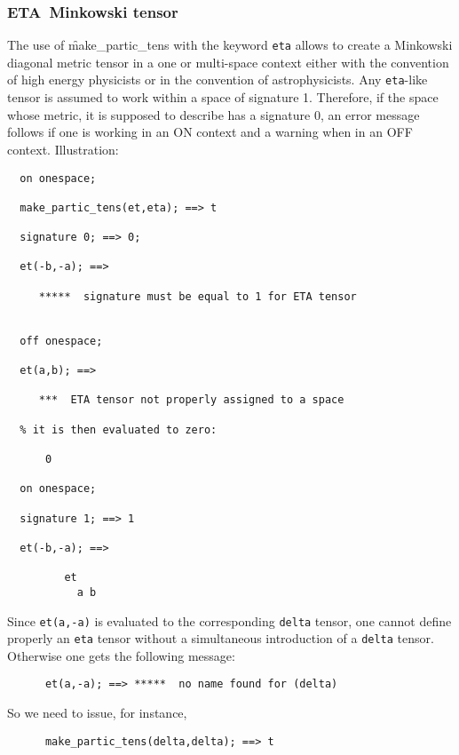 \subsubsection{ETA\ Minkowski tensor}
The use of \f{make\_partic\_tens} with the
keyword \texttt{eta} allows to create a Minkowski diagonal metric tensor in a
one or multi-space context either with the convention of
 high energy physicists or in the convention of astrophysicists.
Any \texttt{eta}-like tensor is assumed to work within a space
of signature 1. Therefore, if the space whose metric, it is supposed
to describe has a signature 0, an error message follows if one is
working in an ON 
context and a warning when in an OFF  context.
Illustration:
\begin{verbatim}
  on onespace;

  make_partic_tens(et,eta); ==> t

  signature 0; ==> 0;

  et(-b,-a); ==>

     *****  signature must be equal to 1 for ETA tensor


  off onespace;

  et(a,b); ==>

     ***  ETA tensor not properly assigned to a space

  % it is then evaluated to zero:

      0

  on onespace;

  signature 1; ==> 1

  et(-b,-a); ==>

         et
           a b
\end{verbatim}
Since \texttt{et(a,-a)} is evaluated to the corresponding \texttt{delta} tensor,
 one cannot define properly an \texttt{eta} tensor without a
simultaneous introduction of a  \texttt{delta} tensor. Otherwise one gets
the following message:
\begin{verbatim}
      et(a,-a); ==> *****  no name found for (delta)
\end{verbatim}
So we need to issue, for instance,
\begin{verbatim}
      make_partic_tens(delta,delta); ==> t
\end{verbatim}
